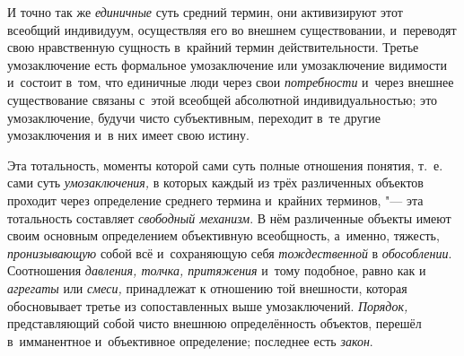 И точно так же
{\em единичные} суть
средний термин, они активизируют этот всеобщий индивидуум, осуществляя его
во внешнем существовании, и~переводят свою нравственную сущность в~крайний
термин
действительности.
Третье умозаключение есть формальное умозаключение или
умозаключение видимости и~состоит в~том, что единичные люди через свои
{\em потребности} и~через
внешнее существование связаны с~этой всеобщей абсолютной индивидуальностью;
это умозаключение, будучи чисто субъективным, переходит в~те другие
умозаключения и~в них имеет свою
истину\label{bkm:bm52c}.

Эта тотальность, моменты которой сами суть полные отношения
понятия, т.~е. сами суть
{\em умозаключения,} в
которых каждый из трёх различенных объектов проходит через определение
среднего термина и~крайних терминов, "--- эта тотальность
составляет {\em свободный механизм}.
В нём различенные объекты имеют своим основным определением
объективную всеобщность, а~именно, тяжесть,
{\em пронизывающую} собой
всё и~сохраняющую себя
{\em тождественной} в
{\em обособлении}.
Соотношения {\em давления,
толчка, притяжения} и~тому подобное, равно как и
{\em агрегаты} или
{\em смеси,} принадлежат
к отношению той внешности, которая обосновывает третье из
сопоставленных выше умозаключений.
{\em Порядок,}
представляющий собой чисто внешнюю определённость объектов,
перешёл в~имманентное и~объективное определение; последнее есть
{\em закон}.


